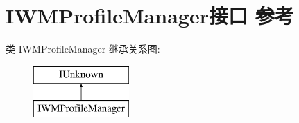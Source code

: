 \hypertarget{interface_i_w_m_profile_manager}{}\section{I\+W\+M\+Profile\+Manager接口 参考}
\label{interface_i_w_m_profile_manager}
类 I\+W\+M\+Profile\+Manager 继承关系图\+:\begin{figure}[H]
\begin{center}
\leavevmode
\includegraphics[height=2.000000cm]{interface_i_w_m_profile_manager}
\end{center}
\end{figure}
